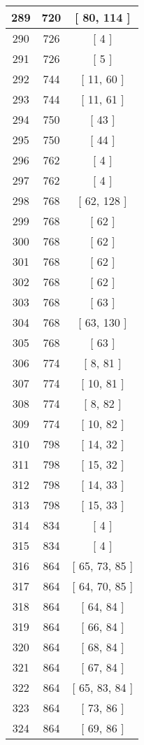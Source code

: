 \begin{center}
\begin{longtable}[H]{|| c c c ||}
\hline
289 & 720 & [ 80, 114 ] \\ 
\hline
290 & 726 & [ 4 ] \\ 
\hline
291 & 726 & [ 5 ] \\ 
\hline
292 & 744 & [ 11, 60 ] \\ 
\hline
293 & 744 & [ 11, 61 ] \\ 
\hline
294 & 750 & [ 43 ] \\ 
\hline
295 & 750 & [ 44 ] \\ 
\hline
296 & 762 & [ 4 ] \\ 
\hline
297 & 762 & [ 4 ] \\ 
\hline
298 & 768 & [ 62, 128 ] \\ 
\hline
299 & 768 & [ 62 ] \\ 
\hline
300 & 768 & [ 62 ] \\ 
\hline
301 & 768 & [ 62 ] \\ 
\hline
302 & 768 & [ 62 ] \\ 
\hline
303 & 768 & [ 63 ] \\ 
\hline
304 & 768 & [ 63, 130 ] \\ 
\hline
305 & 768 & [ 63 ] \\ 
\hline
306 & 774 & [ 8, 81 ] \\ 
\hline
307 & 774 & [ 10, 81 ] \\ 
\hline
308 & 774 & [ 8, 82 ] \\ 
\hline
309 & 774 & [ 10, 82 ] \\ 
\hline
310 & 798 & [ 14, 32 ] \\ 
\hline
311 & 798 & [ 15, 32 ] \\ 
\hline
312 & 798 & [ 14, 33 ] \\ 
\hline
313 & 798 & [ 15, 33 ] \\ 
\hline
314 & 834 & [ 4 ] \\ 
\hline
315 & 834 & [ 4 ] \\ 
\hline
316 & 864 & [ 65, 73, 85 ] \\ 
\hline
317 & 864 & [ 64, 70, 85 ] \\ 
\hline
318 & 864 & [ 64, 84 ] \\ 
\hline
319 & 864 & [ 66, 84 ] \\ 
\hline
320 & 864 & [ 68, 84 ] \\ 
\hline
321 & 864 & [ 67, 84 ] \\ 
\hline
322 & 864 & [ 65, 83, 84 ] \\ 
\hline
323 & 864 & [ 73, 86 ] \\ 
\hline
324 & 864 & [ 69, 86 ] \\ 

\end{longtable}
\end{center}

